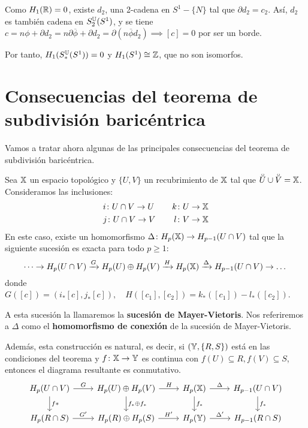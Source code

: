 Como $H_1(\mathbb{R}) = 0$, existe $d_2$, una 2-cadena en $S^1 - \{N\}$ tal que $\partial d_2 = c_2$. Así, $d_2$ es también cadena en $S_2^{\mathbb U}(S^1)$, y se tiene
$c = n\phi + \partial d_2 = n \partial \overline{\phi} + \partial d_2 = \partial(n\overline{\phi}  d_2) \implies [c] = 0$ por ser un borde.

Por tanto, $H_1(S_*^{\mathbb U}(S^1)) = 0$ y $H_1(S^1) \cong \mathbb{Z}$, que no son isomorfos.

\section{Consecuencias del teorema de subdivisión baricéntrica}

Vamos a tratar ahora algunas de las principales consecuencias del teorema de subdivisión baricéntrica.

\begin{theorem}
  Sea ${\mathbb X}$ un espacio topológico y $\{U, V\}$ un recubrimiento de ${\mathbb X}$ tal que $\interior{U} \cup \interior{V} = \X$. Consideramos las inclusiones:
  \begin{align*}
    & i \colon U \cap V \to U &\quad k \colon U \to {\mathbb X} \\
    & j \colon U \cap V \to V &\quad l \colon V \to {\mathbb X}
  \end{align*}
  En este caso, existe un homomorfismo $\Delta \colon H_p({\mathbb X}) \to H_{p-1}(U \cap V)$ tal que la siguiente sucesión es exacta para todo $p \geq 1$:
  \[ \dots \to H_p(U \cap V) \xrightarrow{G} H_p(U) \oplus H_p(V) \xrightarrow{H} H_p({\mathbb X}) \xrightarrow{\Delta} H_{p-1}(U \cap V) \to \dots \]
  donde $G([c]) = (i_*[c], j_*[c]), \quad H([c_1], [c_2]) = k_*([c_1]) - l_*([c_2])$.

  A esta sucesión la llamaremos la \textbf{sucesión de Mayer-Vietoris}. Nos referiremos a $\Delta$ como el \textbf{homomorfismo de conexión}
  de la sucesión de Mayer-Vietoris.

  Además, esta construcción es natural, es decir, si $({\mathbb Y}, \{R, S\})$ está en las condiciones del teorema y $f \colon {\mathbb X} \to {\mathbb Y}$ es continua con
  $f(U) \subseteq R, f(V) \subseteq S$, entonces el diagrama resultante es conmutativo.
  \[ \begin{tikzcd}
    H_p(U \cap V) \arrow{r}{G} \arrow{d}{f*} & H_p(U) \oplus H_p(V) \arrow{r}{H} \arrow{d}{f_*  \oplus f_*} & H_p(\X) \arrow{r}{\Delta} \arrow{d}{f_*} & H_{p-1}(U \cap V) \arrow{d}{f_*} \\
    H_p(R \cap S) \arrow{r}{G'}  & H_p(R) \oplus H_p(S) \arrow{r}{H'} & H_p(\Y) \arrow{r}{\Delta'} & H_{p-1}(R \cap S)
  \end{tikzcd} \]

\end{theorem}


